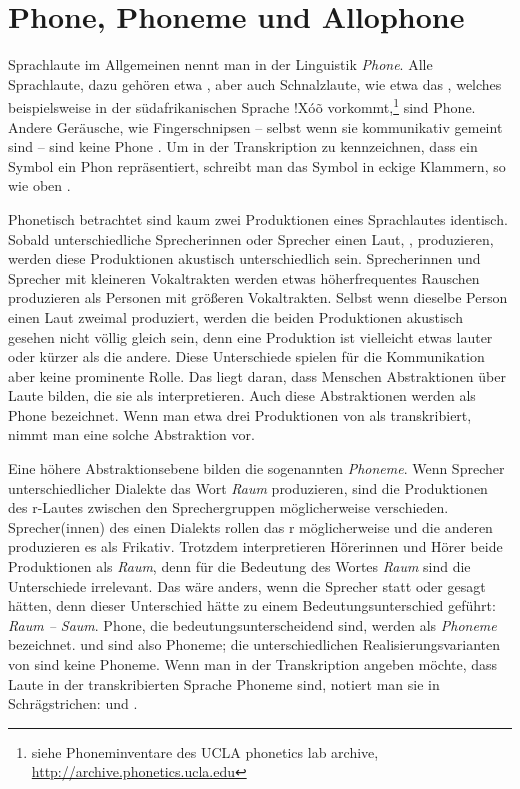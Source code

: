 \section{Phone, Phoneme und Allophone}\label{sec:Allophone}

Sprachlaute im Allgemeinen nennt man in der Linguistik \textit{Phone}. Alle Sprachlaute, dazu gehören etwa \textipa{[s, x, i]}, aber auch Schnalzlaute, wie etwa das \textipa{[!]}, welches beispielsweise in der südafrikanischen Sprache !X\'{o}\~o vorkommt,\footnote{siehe Phoneminventare des UCLA phonetics lab archive, \url{http://archive.phonetics.ucla.edu}} sind Phone. Andere Geräusche, wie \zB Fingerschnipsen -- selbst wenn sie kommunikativ gemeint sind -- sind keine Phone \citep[1]{Katamba1996}. Um in der Transkription zu kennzeichnen, dass ein Symbol ein Phon repräsentiert, schreibt man das Symbol in eckige Klammern, so wie oben  \textipa{[s, x, i]}.

Phonetisch betrachtet sind kaum zwei Produktionen eines Sprachlautes identisch. Sobald unterschiedliche Sprecherinnen oder Sprecher einen Laut, \zB \textipa{[s]}, produzieren, werden diese Produktionen akustisch unterschiedlich sein. Sprecherinnen und Sprecher mit kleineren Vokaltrakten werden etwas höherfrequentes Rauschen produzieren als Personen mit größeren Vokaltrakten. Selbst wenn dieselbe Person einen Laut zweimal produziert, werden die beiden Produktionen akustisch gesehen nicht völlig gleich sein, denn eine Produktion ist vielleicht etwas lauter oder kürzer als die andere. Diese Unterschiede spielen für die Kommunikation aber keine prominente Rolle. Das liegt daran, dass Menschen Ab\-straktionen über Laute bilden, die sie als  interpretieren. Auch diese Ab\-straktionen werden als Phone bezeichnet. Wenn man etwa drei Produktionen von \textipa{[s]} als \textipa{[s]} transkribiert, nimmt man eine solche Ab\-straktion vor.

Eine höhere Ab\-straktionsebene bilden die sogenannten \textit{Phoneme}. Wenn Sprecher unterschiedlicher Dialekte das Wort \textit{Raum} produzieren, sind die Produktionen des r-Lautes zwischen den Sprechergruppen möglicherweise verschieden. Sprecher(innen) des einen Dialekts rollen das r möglicherweise und die anderen produzieren es als Frikativ. Trotzdem interpretieren Hörerinnen und Hörer beide Produktionen als \textit{Raum}, denn für die Bedeutung des Wortes \textit{Raum} sind die Unterschiede irrelevant. Das wäre anders, wenn die Sprecher statt \textipa{[K]} oder \textipa{[r]}  \textipa{[z]} gesagt hätten, denn dieser Unterschied hätte zu einem Bedeutungsunterschied geführt: \textit{Raum -- Saum}. Phone, die bedeutungsunterscheidend sind, werden als \textit{Phoneme} bezeichnet. \textipa{[K]} und \textipa{[z]} sind also Phoneme; die unterschiedlichen Realisierungsvarianten von \textipa{[K]} sind keine Phoneme. Wenn man in der Transkription angeben möchte, dass Laute in der transkribierten Sprache Phoneme sind, notiert man sie in Schrägstrichen:  und .

